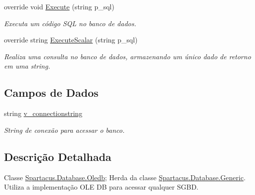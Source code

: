 \begin{DoxyCompactItemize}
override void \hyperlink{classSpartacus_1_1Database_1_1Oledb_acfe60cb51ca949f93a1197c3cdf88231}{Execute} (string p\+\_\+sql)
\begin{DoxyCompactList}\small\item\em Executa um código S\+Q\+L no banco de dados. \end{DoxyCompactList}\item 
override string \hyperlink{classSpartacus_1_1Database_1_1Oledb_a7131081aa9dcb742321104b3a2c0c1f5}{Execute\+Scalar} (string p\+\_\+sql)
\begin{DoxyCompactList}\small\item\em Realiza uma consulta no banco de dados, armazenando um único dado de retorno em uma string. \end{DoxyCompactList}\end{DoxyCompactItemize}
\subsection*{Campos de Dados}
\begin{DoxyCompactItemize}
\item 
string \hyperlink{classSpartacus_1_1Database_1_1Oledb_a7bfa2fa4427cb9a5ae00fc0e58562ece}{v\+\_\+connectionstring}
\begin{DoxyCompactList}\small\item\em String de conexão para acessar o banco. \end{DoxyCompactList}\end{DoxyCompactItemize}


\subsection{Descrição Detalhada}
Classe \hyperlink{classSpartacus_1_1Database_1_1Oledb}{Spartacus.\+Database.\+Oledb}; Herda da classe \hyperlink{classSpartacus_1_1Database_1_1Generic}{Spartacus.\+Database.\+Generic}. Utiliza a implementação O\+L\+E D\+B para acessar qualquer S\+G\+B\+D. 



